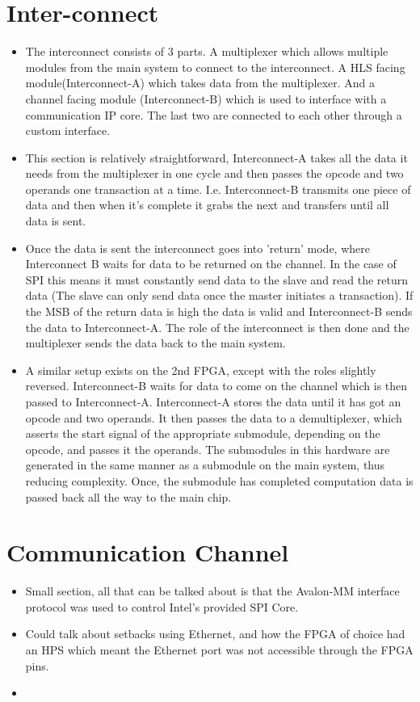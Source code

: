 \section{Inter-connect}

\begin{itemize}
    \item The interconnect consists of 3 parts. A multiplexer which allows multiple modules from the main system to connect to the interconnect. A HLS facing module(Interconnect-A) which takes data from the multiplexer. And a channel facing module (Interconnect-B) which is used to interface with a communication IP core. The last two are connected to each other through a custom interface.
    \item This section is relatively straightforward, Interconnect-A takes all the data it needs from the multiplexer in one cycle and then passes the opcode and two operands one transaction at a time. I.e. Interconnect-B transmits one piece of data and then when it's complete it grabs the next and transfers until all data is sent.
    \item Once the data is sent the interconnect goes into 'return' mode, where Interconnect B waits for data to be returned on the channel. In the case of SPI this means it must constantly send data to the slave and read the return data (The slave can only send data once the master initiates a transaction). If the MSB of the return data is high the data is valid and Interconnect-B sends the data to Interconnect-A. The role of the interconnect is then done and the multiplexer sends the data back to the main system.
    \item A similar setup exists on the 2nd FPGA, except with the roles slightly reversed. Interconnect-B waits for data to come on the channel which is then passed to Interconnect-A. Interconnect-A  stores the data until it has got an opcode and two operands. It then passes the data to a demultiplexer, which asserts the start signal of the appropriate submodule, depending on the opcode, and passes it the operands. The submodules in this hardware are generated in the same manner as a submodule on the main system, thus reducing complexity. Once, the submodule has completed computation data is passed back all the way to the main chip.
\end{itemize}

\section{Communication Channel}

\begin{itemize}
    \item Small section, all that can be talked about is that the Avalon-MM interface protocol was used to control Intel's provided SPI Core.
    \item Could talk about setbacks using Ethernet, and how the FPGA of choice had an HPS which meant the Ethernet port was not accessible through the FPGA pins.
    \item 
\end{itemize}